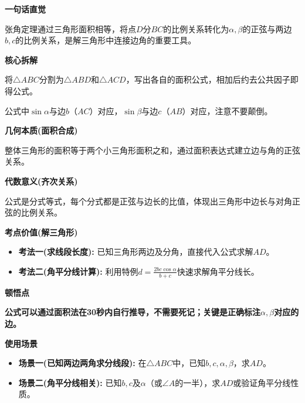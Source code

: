 \begin{explanationbox}
	\textbf{\textcolor{CExplanation}{一句话直觉}}

	张角定理通过三角形面积相等，将点$D$分$BC$的比例关系转化为$\alpha,\beta$的正弦与两边$b,c$的比例关系，是解三角形中连接边角的重要工具。

	\medskip
	\textbf{\textcolor{CExplanation}{核心拆解}}
	\begin{description}[style=nextline, leftmargin=2.8em, labelsep=0.5em, itemsep=0.45em]
		\item[\textbf{要点一(面积法推导):}] 将$\triangle ABC$分割为$\triangle ABD$和$\triangle ACD$，写出各自的面积公式，相加后约去公共因子即得公式。
		\item[\textbf{要点二(边角对应):}] 公式中$\sin\alpha$与边$b$（$AC$）对应，$\sin\beta$与边$c$（$AB$）对应，注意不要颠倒。
	\end{description}

	\medskip
	\textbf{\textcolor{CExplanation}{几何本质(面积合成)}}

	整体三角形的面积等于两个小三角形面积之和，通过面积表达式建立边与角的正弦关系。

	\medskip
	\textbf{\textcolor{CExplanation}{代数意义(齐次关系)}}

	公式是分式等式，每个分式都是正弦与边长的比值，体现出三角形中边长与对角正弦的比例关系。

	\medskip
	\textbf{\textcolor{CExplanation}{考点价值(解三角形)}}
	\begin{itemize}[leftmargin=*, itemsep=0.5em, topsep=0.4em]
		\item \textbf{考法一(求线段长度):} 已知三角形两边及分角，直接代入公式求解$AD$。
		\item \textbf{考法二(角平分线计算):} 利用特例$d=\frac{2bc\cos\alpha}{b+c}$快速求解角平分线长。
	\end{itemize}

	\medskip
	\textbf{\textcolor{CExplanation}{顿悟点}}

	\textbf{公式可以通过面积法在30秒内自行推导，不需要死记；关键是正确标注$\alpha,\beta$对应的边。}

	\medskip
	\textbf{\textcolor{CExplanation}{使用场景}}
	\begin{itemize}[leftmargin=*, itemsep=0.5em, topsep=0.4em]
		\item \textbf{场景一(已知两边两角求分线段):} 在$\triangle ABC$中，已知$b,c,\alpha,\beta$，求$AD$。
		\item \textbf{场景二(角平分线相关):} 已知$b,c$及$\alpha$（或$\angle A$的一半），求$AD$或验证角平分线性质。
	\end{itemize}
\end{explanationbox}
